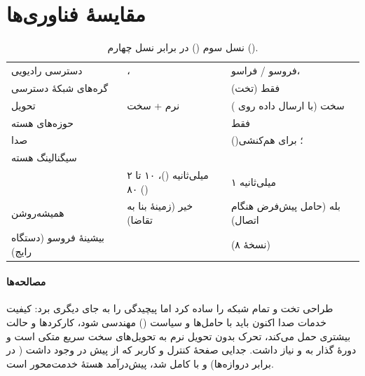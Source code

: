 \documentclass[11pt,a4paper]{article}
\begin{document}
\section{مقایسهٔ فناوری‌ها}
\begin{table}[htbp]
\centering\small
\caption{نسل سوم () در برابر نسل چهارم ().}\label{tab:3g4g}
\begin{tabularx}{\linewidth}{@{}l Y Y@{}}
\toprule
{} &  &  \\
\midrule
دسترسی رادیویی       & ،             &  فروسو /  فراسو،  \\
گره‌های شبکهٔ دسترسی &                      & فقط  (تخت) \\
تحویل                & نرم + سخت                            & سخت (با ارسال داده روی ) \\
حوزه‌های هسته        &                          & فقط  \\
صدا                  &                             &  ()؛  برای هم‌کنشی \\
سیگنالینگ هسته       &        &  \\
           & ۲ میلی‌ثانیه ()، ۱۰ تا ۸۰ () & ۱ میلی‌ثانیه \\
 همیشه‌روشن & خیر (زمینهٔ  بنا به تقاضا)  & بله (حامل پیش‌فرض هنگام اتصال) \\
بیشینهٔ فروسو (دستگاه رایج) &            &  (نسخهٔ ۸) \\
\bottomrule
\end{tabularx}
\end{table}

\paragraph{مصالحه‌ها} طراحی تخت و تمام‌ شبکه را ساده کرد اما پیچیدگی را به جای دیگری برد: کیفیت
خدمات صدا اکنون باید با حامل‌ها و سیاست () مهندسی شود،  کارکردها و حالت بیشتری
حمل می‌کند، تحرک بدون تحویل نرم به تحویل‌های سخت سریع متکی است و دورهٔ گذار به  و 
نیاز داشت. جدایی صفحهٔ کنترل و کاربر که از پیش در  وجود داشت ( در برابر دروازه‌ها) و با
 کامل شد، پیش‌درآمد هستهٔ خدمت‌محور  است.
\end{document}

